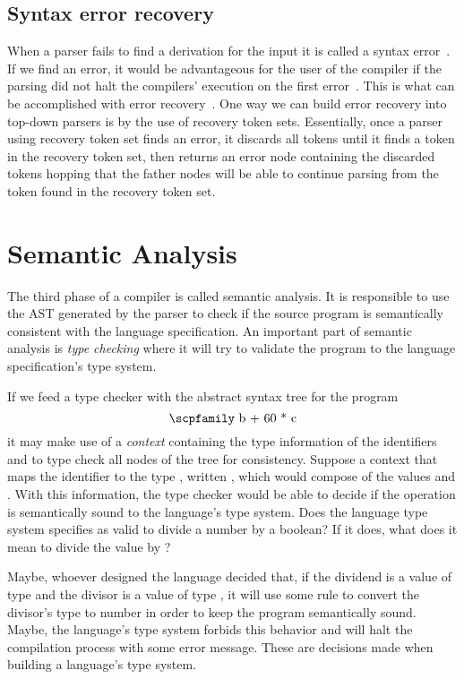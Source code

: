 \documentclass[
  oneside,
  english,
  coorientadorbanca,
  noabntexcite
]{ufsc-thesis-rn46-2019}
\newcommand{\codett}[1]{\text{\scpfamily#1}}
\newcommand{\code}[1]{\text{\scpfamily\setlength\spaceskip{0.35em}#1}}
\newcommand{\typer}[2]{\code{#1 \codett{:} #2}}
\begin{document}
\subsection{Syntax error recovery}

When a parser fails to find a derivation for the input it is called a syntax error~\cite{appel2003modern}.
If we find an error, it would be advantageous for the user of the compiler if the parsing did not halt the compilers' execution on the first error~\cite{appel2003modern}.
This is what can be accomplished with error recovery~\cite{appel2003modern}.
One way we can build error recovery into top-down parsers is by the use of recovery token sets.
Essentially, once a parser using recovery token set finds an error, it discards all tokens until it finds a token in the recovery token set, then returns an error node containing the discarded tokens hopping that the father nodes will be able to continue parsing from the token found in the recovery token set.

\section{Semantic Analysis}\label{chapter:background:sec:semantic}

The third phase of a compiler is called semantic analysis.
It is responsible to use the AST generated by the parser to check if the source program is semantically consistent with the language specification.
An important part of semantic analysis is \textit{type checking} where it will try to validate the program to the language specification's type system.

If we feed a type checker with the abstract syntax tree for the program
\begin{equation*}
  \codett{b + 60 * c}
\end{equation*}
it may make use of a \textit{context} containing the type information of the identifiers \code{b} and \code{c} to type check all nodes of the tree for consistency.
Suppose a context that maps the identifier \code{c} to the type \code{Bool}, written \typer{c}{Bool}, which would compose of the values \code{true} and \code{false}.
With this information, the type checker would be able to decide if the operation \code{60 * c} is semantically sound to the language's type system.
Does the language type system specifies as valid to divide a number by a boolean?
If it does, what does it mean to divide the value \codett{60} by \codett{false}?

Maybe, whoever designed the language decided that, if the dividend is a value of type \code{Int} and the divisor is a value of type \code{Bool}, it will use some rule to convert the divisor's type to number in order to keep the program semantically sound.
Maybe, the language's type system forbids this behavior and will halt the compilation process with some error message.
These are decisions made when building a language's type system.
\end{document}
